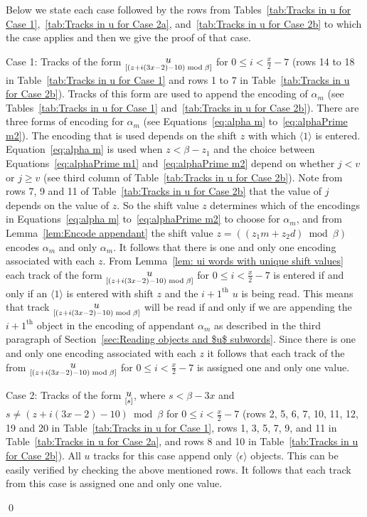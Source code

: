 \documentclass[11pt]{article} \usepackage{amsfonts,amsmath,amssymb,amsthm}
\renewenvironment{proof}{{\bfseries\noindent Proof.}}{\qed\vspace{3.5ex}}
\newcommand{\tne}[1]{\ensuremath{\langle #1\rangle}}
\newcommand{\encodeOne}{\tne{1}}
\newcommand{\encodeDeletion}{\tne{\epsilon}}
\newcommand{\track}[2]{\raisebox{2.5pt}{\ensuremath{\underset{[#1]}#2}}}
\begin{document}
\begin{proof} 
Below we state each case followed by the rows from Tables~\ref{tab:Tracks in u for Case 1},~\ref{tab:Tracks in u for Case 2a}, and~\ref{tab:Tracks in u for Case 2b} to which the case applies and then we give the proof of that case.

Case 1: Tracks of the form $\track{(z+i(3x-2)-10)\bmod \beta}{u}$ for $0\leqslant i< \frac{x}{2}-7$ (rows 14 to 18 in Table~\ref{tab:Tracks in u for Case 1} and rows 1 to 7 in Table~\ref{tab:Tracks in u for Case 2b}).
Tracks of this form are used to append the encoding of $\alpha_m$ (see Tables~\ref{tab:Tracks in u for Case 1} and~\ref{tab:Tracks in u for Case 2b}). 
There are three forms of encoding for $\alpha_m$ (see Equations~\eqref{eq:alpha m} to~\eqref{eq:alphaPrime m2}). 
The encoding that is used depends on the shift $z$ with which $\encodeOne$ is entered. Equation~\eqref{eq:alpha m} is used when $z<\beta-z_1$ and the choice between Equations~\eqref{eq:alphaPrime m1} and~\eqref{eq:alphaPrime m2} depend on whether $j<v$ or $j\geqslant v$ (see third column of Table~\ref{tab:Tracks in u for Case 2b}).
Note from rows 7, 9 and 11 of Table~\ref{tab:Tracks in u for Case 2b} that the value of $j$ depends on the value of $z$.
So the shift value $z$ determines which of the encodings in Equations~\eqref{eq:alpha m} to~\eqref{eq:alphaPrime m2} to choose for $\alpha_m$, and from Lemma~\ref{lem:Encode appendant} the shift value $z=((z_1m+z_2d)\bmod\beta)$ encodes $\alpha_m$ and only $\alpha_m$. 
It follows that there is one and only one encoding associated with each $z$.
From Lemma~\ref{lem: ui words with unique shift values} each track of the form $\track{(z+i(3x-2)-10)\bmod \beta}{u}$ for $0\leqslant i< \frac{x}{2}-7$ is entered if and only if an $\encodeOne$ is entered with shift $z$ and the $i+1^{\textrm{th}}$ $u$ is being read. 
This means that track $\track{(z+i(3x-2)-10)\bmod \beta}{u}$ will be read if and only if we are appending the $i+1^\textrm{th}$ object in the encoding of appendant $\alpha_m$ as described in the third paragraph of Section~\ref{sec:Reading objects and $u$ subwords}.
Since there is one and only one encoding associated with each $z$ it follows that each track of the from $\track{(z+i(3x-2)-10)\bmod \beta}{u}$ for $0\leqslant i< \frac{x}{2}-7$ is assigned one and only one value.  


Case 2: Tracks of the form $\track{s}{u}$, where $s<\beta-3x$ and $s\neq (z+i(3x-2)-10)\bmod \beta$ for $0\leqslant i< \frac{x}{2}-7$ (rows 2, 5, 6, 7, 10, 11, 12, 19 and 20 in Table~\ref{tab:Tracks in u for Case 1}, rows 1, 3, 5, 7, 9, and 11 in Table~\ref{tab:Tracks in u for Case 2a}, and rows 8 and 10 in Table~\ref{tab:Tracks in u for Case 2b}). All $u$ tracks for this case append only $\encodeDeletion$ objects. This can be easily verified by checking the above mentioned rows. It follows that each track from this case is assigned one and only one value.


\end{proof}
\end{document}
